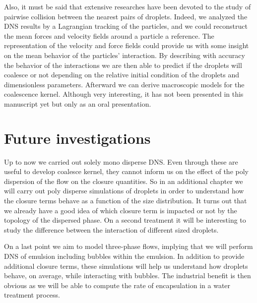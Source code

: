 Also, it must be said that extensive researches have been devoted to the study of pairwise collision between the nearest pairs of droplets.
Indeed, we analyzed the DNS results by a Lagrangian tracking of the particles, and we could reconstruct the mean forces and velocity fields around a particle a reference. 
The representation of the velocity and force fields could provide us with some insight on the mean behavior of the particles' interaction. 
By describing with accuracy the behavior of the interactions we are then able to predict if the droplets will coalesce or not depending on the relative initial condition of the droplets and dimensionless parameters. 
Afterward we can derive macroscopic models for the coalescence kernel. 
Although very interesting, it has not been presented in this manuscript yet but only as an oral presentation. 

\section*{Future investigations}

Up to now we carried out solely mono disperse DNS. 
Even through these are useful to develop coalesce kernel, they cannot inform us on the effect of the poly dispersion of the flow on the closure quantities. 
So in an additional chapter we will carry out poly disperse simulations of droplets in order to understand how the closure terms behave as a function of the size distribution. 
It turns out that we already have a good idea of which closure term is impacted or not by the topology of the dispersed phase. 
On a second treatment it will be interesting to study the difference between the interaction of different sized droplets. 

On a last point we aim to model three-phase flows, implying that we will perform DNS of emulsion including bubbles within the emulsion. 
In addition to provide additional closure terms, these simulations will help us understand how droplets behave, on average, while interacting with bubbles. 
The industrial benefit is then obvious as we will be able to compute the rate of encapsulation in a water treatment process. 

